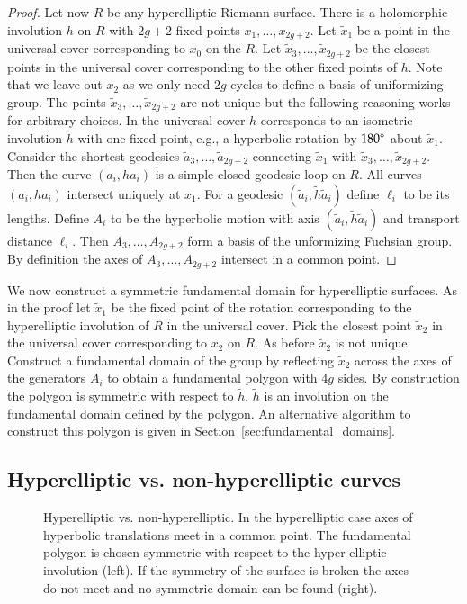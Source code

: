 \documentclass[Thesis]{subfiles}
\begin{document}
\begin{proof}
Let now $R$ be any hyperelliptic Riemann surface. There is a holomorphic involution $h$ on $R$ with $2g + 2$ fixed points $x_1,\ldots,x_{2g+2}$. 
Let $\tilde x_1$ be a point in the universal cover corresponding to $x_0$ on the $R$. Let $\tilde x_3,\ldots,\tilde x_{2g+2}$ be the closest points in the universal cover corresponding to the other fixed points of $h$. Note that we leave out $x_2$ as we only need $2g$ cycles to define a basis of uniformizing group. 
The points $\tilde x_3,\ldots,\tilde x_{2g+2}$ are not unique but the following reasoning works for arbitrary choices.
In the universal cover $h$ corresponds to an isometric involution $\tilde h$ with one fixed point, e.g., a hyperbolic rotation by $180\degree$ about $\tilde x_1$.
Consider the shortest geodesics $\tilde a_3,\ldots,\tilde a_{2g+2}$ connecting $\tilde x_1$ with $\tilde x_3,\ldots,\tilde x_{2g+2}$.
Then the curve $(a_i, h a_i)$ is a simple closed geodesic loop on $R$.
All curves $(a_i, h a_i)$ intersect uniquely at $x_1$. 
For a geodesic $(\tilde a_i, \tilde h \tilde a_i)$ define $\ell_i$ to be its lengths.
Define $A_i$ to be the hyperbolic motion with axis $(\tilde a_i, \tilde h \tilde a_i)$ and transport distance $\ell_i$.
Then $A_3,\ldots,A_{2g+2}$ form a basis of the unformizing Fuchsian group.
By definition the axes of $A_3,\ldots,A_{2g+2}$ intersect in a common point.
\end{proof}

We now construct a symmetric fundamental domain for hyperelliptic surfaces.
As in the proof let $\tilde x_1$ be the fixed point of the rotation corresponding to the hyperelliptic involution of $R$ in the universal cover.
Pick the closest point $\tilde x_2$ in the universal cover corresponding to $x_2$ on $R$.
As before $\tilde x_2$ is not unique.
Construct a fundamental domain of the group by reflecting $\tilde x_2$ across the axes of the generators $A_i$ to obtain a fundamental polygon with $4g$ sides.
By construction the polygon is symmetric with respect to $\tilde h$. 
$\tilde h$ is an involution on the fundamental domain defined by the polygon.
An alternative algorithm to construct this polygon is given in Section~\ref{sec:fundamental_domains}.

\subsection{Hyperelliptic vs. non-hyperelliptic curves}
\label{sec:non-hyperelliptic}

\begin{figure}
\centering
{}
\caption{Hyperelliptic vs. non-hyperelliptic. In the hyperelliptic case axes of hyperbolic translations meet in a common point. The fundamental polygon is chosen symmetric with respect to the hyper elliptic involution (left). If the symmetry of the surface is broken the axes do not meet and no symmetric domain can be found (right).}
\label{fig:non-hyperelliptic}
\end{figure}
\end{document}
